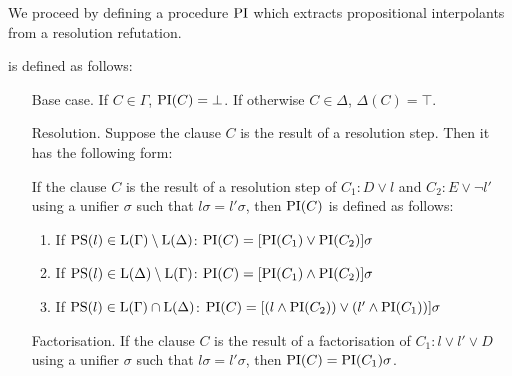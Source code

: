 We proceed by defining a procedure $\operatorname{PI}$ which extracts propositional interpolants from a resolution refutation.

\begin{defi}
	 is defined as follows:
	\label{def:PI}
\begin{itemize}
	\item[Base case.]
		If $C \in \Gamma$, $\operatorname{PI}(C) = \bot$. 
		If otherwise $C \in \Delta$, $\Delta(C) = \top$. 
	\item[Resolution.]
	\label{def:PI_resolution}
		Suppose the clause $C$ is the result of a resolution step. Then it has the following form: 

		If the clause $C$ is the result of a resolution step of $C_1: D \lor l$ and $C_2: E \lor \lnot l'$ using a unifier $\sigma$ such that $l\sigma = l'\sigma$, then $\operatorname{PI}(C)$ is defined as follows:
		\begin{enumerate}
			\item If $\operatorname{PS}(l) \in \operatorname{L}(\Gamma) \setminus \operatorname{L}(\Delta)$: $\operatorname{PI}(C) = [\operatorname{PI}(C_1) \lor \operatorname{PI}(C_2)]\sigma$
			\item If $\operatorname{PS}(l) \in \operatorname{L}(\Delta) \setminus \operatorname{L}(\Gamma)$: $\operatorname{PI}(C) = [\operatorname{PI}(C_1) \land \operatorname{PI}(C_2)]\sigma$
			\item If $\operatorname{PS}(l) \in \operatorname{L}(\Gamma) \cap \operatorname{L}(\Delta)$: $\operatorname{PI}(C) = [(l \land \operatorname{PI}(C_2)) \lor (l' \land \operatorname{PI}(C_1)) ]\sigma $
		\end{enumerate}

	\item[Factorisation.]
		If the clause $C$ is the result of a factorisation of $C_1: l \lor l' \lor D$ using a unifier $\sigma$ such that $l\sigma = l'\sigma$, then $\operatorname{PI}(C) = \operatorname{PI}(C_1)\sigma$.


\end{itemize}
\end{defi}
